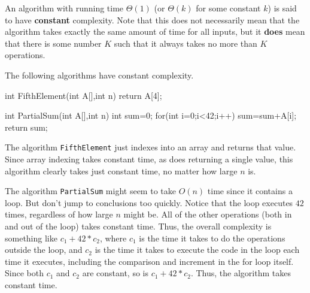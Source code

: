 \begin{df}[Constant]
An algorithm with running time $\Theta(1)$ 
(or $\Theta(k)$ for some constant $k$)
is said to have {\bf constant} complexity.  
Note that this does not necessarily mean that the algorithm takes 
exactly the same amount of time for all inputs, but it {\bf does}
mean that there is some number $K$ such that it always takes 
no more than $K$ operations.
\end{df}

\begin{exa}
The following algorithms have constant complexity.

\begin{minipage}[t]{.45\textwidth}\begin{code}
int FifthElement(int A[],int n) 
{
    return A[4];
}

\end{code} 
\end{minipage}
\hfill
\begin{minipage}[t]{.5\textwidth}\begin{code}
    int PartialSum(int A[],int n) {
        int sum=0;
        for(int i=0;i<42;i++) 
           sum=sum+A[i];
        return sum;
    }
\end{code} 
\end{minipage}
The algorithm \verb+FifthElement+ just indexes into an array and returns that value.
Since array indexing takes constant time, as does returning a single value,
this algorithm clearly takes just constant time, no matter how large $n$ is.

The algorithm \verb+PartialSum+ might seem to take $O(n)$ time since it contains
a loop.  But don't jump to conclusions too quickly.  Notice that the loop executes
$42$ times, regardless of how large $n$ might be.  All of the other operations
(both in and out of the loop) takes constant time.  Thus, the overall complexity
is something like $c_1+42*c_2$, where $c_1$ is the time it takes to do the operations
outside the loop, and $c_2$ is the time it takes to execute the code in the loop 
each time it executes, including the comparison and increment in the for loop itself.
Since both $c_1$ and $c_2$ are constant, so is $c_1+42*c_2$.  Thus, the algorithm
takes constant time.
\end{exa}

